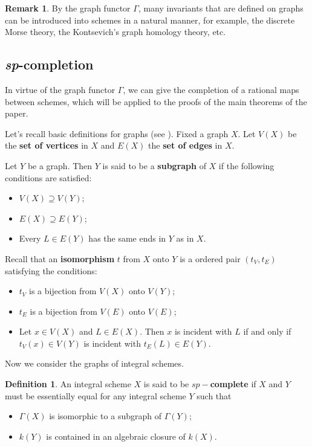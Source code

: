 \documentclass[12pt,twoside,reqno]{amsart}
\theoremstyle{definition}
\newtheorem{definition}[theorem]{Definition}
\newtheorem{remark}[theorem]{Remark}
\numberwithin{equation}{section}
\begin{document}
\begin{remark}
By the graph functor $\Gamma$, many invariants that are defined on graphs can be introduced into schemes in a natural manner, for example,
the discrete Morse theory, the Kontsevich's graph
homology theory, etc.
\end{remark}

\subsection{\emph{sp}-completion}

In virtue of the graph functor $\Gamma$, we can give the completion
of a rational maps between schemes, which will be applied to the proofs of the main theorems of the paper.

Let's recall basic definitions for graphs (see \cite{tut}).
Fixed a graph $X$. Let $V(X)$ be the \textbf{set of vertices} in $X$ and  $E(X)$ the \textbf{set of edges} in $X$.

Let $Y$ be a graph. Then $Y$ is said to be a \textbf{subgraph} of $X$ if the following conditions are satisfied:
\begin{itemize}
\item $V(X)\supseteq V(Y)$;

\item $E(X)\supseteq E(Y)$;

\item Every $L\in E(Y)$ has the same ends in $Y$ as in $X$.
\end{itemize}

Recall that an \textbf{isomorphism} $t$ from $X$ onto $Y$ is a ordered pair $(t_{V},t_{E})$ satisfying the conditions:
\begin{itemize}
\item $t_{V}$ is a bijection from $V(X)$ onto $V(Y)$;

\item $t_{E}$ is a bijection from $V(E)$ onto $V(E)$;

\item Let $x \in V(X)$ and $L\in E(X)$. Then $x $ is incident with $L$ if and only if $t_{V}(x) \in V(Y)$ is incident with $t_{E}(L)\in E(Y)$.
\end{itemize}

Now we consider the graphs of integral schemes.

\begin{definition}
An integral scheme $X$ is said to be \textbf{$sp-$complete} if $X$ and $Y$ must be essentially equal for any integral scheme $Y$ such that
\begin{itemize}
\item $\Gamma (X)$ is isomorphic to a subgraph of $\Gamma (Y)$;

\item $k(Y)$ is contained in an algebraic closure of $k(X)$.
\end{itemize}
\end{definition}
\end{document}

